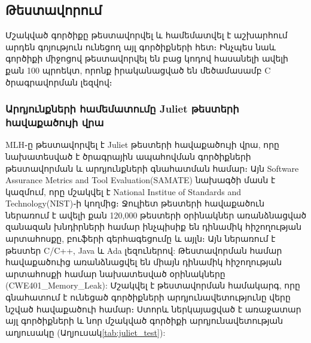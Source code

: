 {
    \subsection{Թեստավորում}\label{subsec:testing}
    Մշակված գործիքը թեստավորվել և համեմատվել է աշխարհում արդեն գոյություն ունեցող այլ գործիքների հետ։ Ինչպես նաև գործիքի
    միջոցով թեստավորվել են բաց կոդով հասանելի ավելի քան 100 պրոեկտ, որոնք իրականացված են մեծամասամբ C ծրագրավորման լեզվով։

    \subsubsection{Արդյունքների համեմատումը Juliet թեստերի հավաքածույի վրա}
    MLH֊ը թեստավորվել է Juliet թեստերի հավաքածույի վրա, որը նախատեսված է ծրագրային ապահովման գործիքների թեստավորման և
    արդյունքների գնահատման համար։ Այն Software Assurance Metrics and Tool Evaluation(SAMATE)\cite{SAMATE} նախագծի մասն է
    կազմում, որը մշակվել է National Institue of Standards and Technology(NIST)֊ի կողմից։ Ջուլիետ թեստերի հավաքածուն
    ներառում է ավելի քան 120,000 թեստերի օրինակներ առանձնացված զանազան խնդիրների համար ինչպիսիք են դինամիկ հիշողության
    արտահոսքը, բուֆերի գերհագեցումը և այլն։ Այն ներառում է թեստեր C/C++, Java և Ada լեզուներով:
    Թեստավորման համար հավաքածուից առանձնացվել են միայն դինամիկ հիշողության արտահոսքի համար նախատեսված
    օրինակները (CWE401\_Memory\_Leak\cite{CWE401}): Մշակվել է թեստավորման համակարգ, որը գնահատում է ունեցած գործիքների
    արդյունավետությունը վերը նշված հավաքածուի համար։ Ստորև ներկայացված է առաջատար այլ գործիքների և
    նոր մշակված գործիքի արդյունավետության աղյուսակը (Աղյուսակ\ref{tab:juliet_test}):
    
}